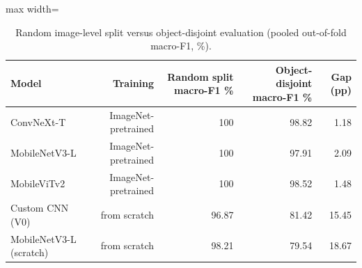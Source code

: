 \begin{table}[!htbp]
\centering
\scriptsize
\caption{Random image-level split versus object-disjoint evaluation (pooled out-of-fold macro-F1, \%).}
\label{tab:s_leakage}
\begin{adjustbox}{max width=\textwidth}
\begin{tabular}{@{}lrrrr@{}}
\toprule
Model & Training & Random split macro-F1 \% & Object-disjoint macro-F1 \% & Gap (pp) \\
\midrule
ConvNeXt-T & ImageNet-pretrained & 100 & 98.82 & 1.18 \\
MobileNetV3-L & ImageNet-pretrained & 100 & 97.91 & 2.09 \\
MobileViTv2 & ImageNet-pretrained & 100 & 98.52 & 1.48 \\
Custom CNN (V0) & from scratch & 96.87 & 81.42 & 15.45 \\
MobileNetV3-L (scratch) & from scratch & 98.21 & 79.54 & 18.67 \\
\bottomrule
\end{tabular}
\end{adjustbox}
\end{table}
